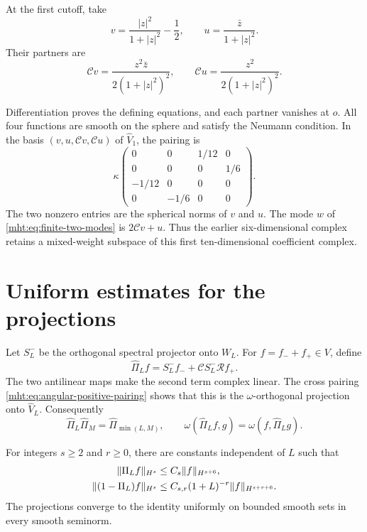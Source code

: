 At the first cutoff, take
\begin{equation}\label{mht:eq:angular-first-modes}
 v=\frac{|z|^2}{1+|z|^2}-\frac12,
 \qquad u=\frac{\bar z}{1+|z|^2}.
\end{equation}
Their partners are
\[
 \mathcal Cv=\frac{z^2\bar z}{2(1+|z|^2)^2},
 \qquad \mathcal Cu=\frac{z^2}{2(1+|z|^2)^2}.
\]

Differentiation proves the defining equations, and each partner
vanishes at $o$. All four functions are smooth on the sphere and
satisfy the Neumann condition. In the basis
$(v,u,\mathcal Cv,\mathcal Cu)$ of $\widehat V_1$, the pairing is
\begin{equation}\label{mht:eq:angular-first-pairing}
 \kappa\begin{pmatrix}
 0&0&1/12&0\\
 0&0&0&1/6\\
 -1/12&0&0&0\\
 0&-1/6&0&0
 \end{pmatrix}.
\end{equation}
The two nonzero entries are the spherical norms of $v$ and $u$.
The mode $w$ of \eqref{mht:eq:finite-two-modes} is $2\mathcal Cv+u$.
Thus the earlier six-dimensional complex retains a mixed-weight
subspace of this first ten-dimensional coefficient complex.

\section{Uniform estimates for the projections}

Let $S_L^-$ be the orthogonal spectral projector onto $W_L$.
For $f=f_-+f_+\in V$, define
\begin{equation}\label{mht:eq:angular-projection}
 \widehat\Pi_Lf=S_L^-f_-+\mathcal CS_L^-\mathcal Rf_+.
\end{equation}
The two antilinear maps make the second term complex linear.
The cross pairing \eqref{mht:eq:angular-positive-pairing} shows that
this is the $\omega$-orthogonal projection onto $\widehat V_L$.
Consequently
\[
 \widehat\Pi_L\widehat\Pi_M=\widehat\Pi_{\min(L,M)},
 \qquad
 \omega(\widehat\Pi_Lf,g)=\omega(f,\widehat\Pi_Lg).
\]

\begin{theorem}\label{mht:thm:angular-tame}
For integers $s\geq2$ and $r\geq0$, there are constants independent
of $L$ such that
\begin{align}
 \|\widehat\Pi_Lf\|_{H^s}
       &\leq C_s\|f\|_{H^{s+6}},\notag\\
 \|(1-\widehat\Pi_L)f\|_{H^s}
       &\leq C_{s,r}(1+L)^{-r}\|f\|_{H^{s+r+6}}.
 \label{mht:eq:angular-tame}
\end{align}
The projections converge to the identity uniformly on bounded
smooth sets in every smooth seminorm.
\end{theorem}

